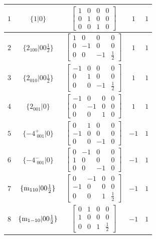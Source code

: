 \documentclass[fleqn,8pt]{jsarticle}
\begin{document}
\begin{longtable}{ccccc}
$ 1 $ & $ \{1|0\} $ & $ \begin{bmatrix} 1 & 0 & 0 & 0 \\ 0 & 1 & 0 & 0 \\ 0 & 0 & 1 & 0 \end{bmatrix} $ & $ 1 $ & $ 1 $ \\ \hline
$ 2 $ & $ \{2{}_{100}|0 0 \frac{1}{2}\} $ & $ \begin{bmatrix} 1 & 0 & 0 & 0 \\ 0 & -1 & 0 & 0 \\ 0 & 0 & -1 & \frac{1}{2} \end{bmatrix} $ & $ 1 $ & $ 1 $ \\ \hline
$ 3 $ & $ \{2{}_{010}|0 0 \frac{1}{2}\} $ & $ \begin{bmatrix} -1 & 0 & 0 & 0 \\ 0 & 1 & 0 & 0 \\ 0 & 0 & -1 & \frac{1}{2} \end{bmatrix} $ & $ 1 $ & $ 1 $ \\ \hline
$ 4 $ & $ \{2{}_{001}|0\} $ & $ \begin{bmatrix} -1 & 0 & 0 & 0 \\ 0 & -1 & 0 & 0 \\ 0 & 0 & 1 & 0 \end{bmatrix} $ & $ 1 $ & $ 1 $ \\ \hline
$ 5 $ & $ \{-4^{+}_{\,\,001}|0\} $ & $ \begin{bmatrix} 0 & 1 & 0 & 0 \\ -1 & 0 & 0 & 0 \\ 0 & 0 & -1 & 0 \end{bmatrix} $ & $ -1 $ & $ 1 $ \\ \hline
$ 6 $ & $ \{-4^{-}_{\,\,001}|0\} $ & $ \begin{bmatrix} 0 & -1 & 0 & 0 \\ 1 & 0 & 0 & 0 \\ 0 & 0 & -1 & 0 \end{bmatrix} $ & $ -1 $ & $ 1 $ \\ \hline
$ 7 $ & $ \{{\rm m}_{110}|0 0 \frac{1}{2}\} $ & $ \begin{bmatrix} 0 & -1 & 0 & 0 \\ -1 & 0 & 0 & 0 \\ 0 & 0 & 1 & \frac{1}{2} \end{bmatrix} $ & $ -1 $ & $ 1 $ \\ \hline
$ 8 $ & $ \{{\rm m}_{1-10}|0 0 \frac{1}{2}\} $ & $ \begin{bmatrix} 0 & 1 & 0 & 0 \\ 1 & 0 & 0 & 0 \\ 0 & 0 & 1 & \frac{1}{2} \end{bmatrix} $ & $ -1 $ & $ 1 $ \\ \hline

\end{longtable}
\end{document}
